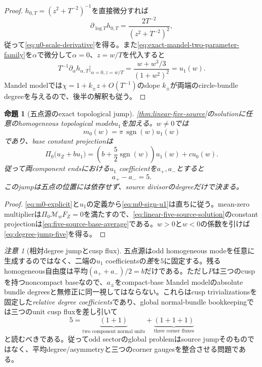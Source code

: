\documentclass[11pt,a4paper]{ltjsarticle}
\newtheorem{proposition}[theorem]{命題}
\theoremstyle{definition}
\theoremstyle{remark}
\newtheorem{remark}[theorem]{注意}
\begin{document}
\begin{proof}
$h_{0,T}=(z^2+T^{-2})^{-1}$を直接微分すれば
\[
 \partial_{\log T}h_{0,T}
 =\frac{2T^{-2}}{(z^2+T^{-2})^2},
\]
従って\eqref{eq:u0-scale-derivative}を得る。また\eqref{eq:exact-mandel-two-parameter-family}を$\alpha$で微分して$\alpha=0$、$z=w/T$を代入すると
\[
 T^{-1}\partial_\alpha h_{\alpha,T}|_{\alpha=0,z=w/T}
 =\frac{w+w^3/3}{(1+w^2)^2}
 =u_1(w).
\]
Mandel modelでは$\chi=1+k_\pm z+O(T^{-1})$のslope $k_\pm$が両端のcircle-bundle degreeを与えるので、後半の解釈も従う\cite{Mandel}。
\end{proof}

\begin{proposition}[五点源のexact topological jump]\label{prop:five-source-degree-jump}
\cref{thm:linear-five-source}のsolutionに任意のhomogeneous topological mode$b u_1$を加える。$w\ne0$では
\begin{equation}\label{eq:m0-sign-u1}
 m_0(w)=\pi\,\operatorname{sgn}(w)u_1(w)
\end{equation}
であり、base constant projectionは
\begin{equation}\label{eq:five-source-base-average}
 \Pi_0\bigl(u_Z+b u_1\bigr)
 =\left(b+\frac52\operatorname{sgn}(w)\right)u_1(w)
 +c u_0(w).
\end{equation}
従って両component endsにおける$u_1$ coefficientを$a_+,a_-$とすると
\begin{equation}\label{eq:degree-jump-five}
 a_+-a_-=5.
\end{equation}
このjumpは五点の位置には依存せず、source divisorのdegreeだけで決まる。
\end{proposition}

\begin{proof}
\eqref{eq:m0-explicit}と$u_1$の定義から\eqref{eq:m0-sign-u1}は直ちに従う。mean-zero multiplierは$\Pi_0\mathcal M_wF_Z=0$を満たすので、\eqref{eq:linear-five-source-solution}のconstant projectionは\eqref{eq:five-source-base-average}である。$w>0$と$w<0$の係数を引けば\eqref{eq:degree-jump-five}を得る。
\end{proof}

\begin{remark}[相対degree jumpとcusp flux]\label{rem:odd-degree-affine-line}
五点源はodd homogeneous modeを任意に生成するのではなく、二端の$u_1$ coefficientsの\emph{差}を$5$に固定する。残るhomogeneous自由度は平均$(a_++a_-)/2=b$だけである。ただし$P$は三つのcuspを持つnoncompact baseなので、$a_\pm$をcompact-base Mandel modelのabsolute bundle degreesと無修正に同一視してはならない。これらはcusp trivializationsを固定した\emph{relative degree coefficients}であり、global normal-bundle bookkeepingでは三つのunit cusp fluxを差し引いて
\[
 5=\underbrace{(1+1)}_{\text{two component normal units}}
   +\underbrace{(1+1+1)}_{\text{three corner fluxes}}
\]
と読むべきである。従ってodd sectorのglobal problemはsource jumpそのものではなく、平均degree/asymmetryと三つのcorner gaugesを整合させる問題である。
\end{remark}
\end{document}
